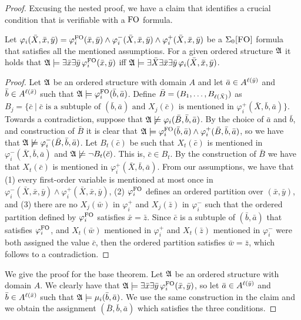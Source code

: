 \begin{proof}
	Excusing the nested proof, we have a claim that identifies a crucial condition that is verifiable with a ${\rm FO}$ formula. 
	\begin{claim}
		Let $\varphi_i(\bar{X},\bar{x},\bar{y}) = \varphi^{{\rm FO}}_i(\bar{x},\bar{y}) \wedge \varphi^{-}_i(\bar{X},\bar{x},\bar{y}) \wedge \varphi^{+}_i(\bar{X},\bar{x},\bar{y})$ be a $\Sigma_{0}\textsc{[FO]}$ formula that satisfies all the mentioned assumptions. For a given ordered structure $\mathfrak{A}$ it holds that $\mathfrak{A}\models\exists\bar{x}\exists\bar{y}\,\varphi^{{\rm FO}}_i(\bar{x},\bar{y})$ iff $\mathfrak{A}\models\exists\bar{X}\exists\bar{x}\exists\bar{y}\,\varphi_i(\bar{X},\bar{x},\bar{y})$.
	\end{claim}
	\begin{proof}
		Let $\mathfrak{A}$ be an ordered structure with domain $A$ and let $\bar{a}\in A^{\ell(\bar{y})}$ and $\bar{b}\in A^{\ell(\bar{x})}$ such that $\mathfrak{A}\models\varphi^{{\rm FO}}_i(\bar{b},\bar{a})$. Define $\bar{B} = (B_1,\ldots,B_{\ell(\bar{X})})$ as $B_j = \{\bar{c}\mid\bar{c}\text{ is a subtuple of $(\bar{b},\bar{a})$ and $X_j(\bar{c})$ is mentioned in $\varphi^{+}_i(\bar{X},\bar{b},\bar{a})$}\}$. Towards a contradiction, suppose that $\mathfrak{A}\not\models\varphi_i(\bar{B},\bar{b},\bar{a})$. By the choice of $\bar{a}$ and $\bar{b}$, and construction of $\bar{B}$ it is clear that $\mathfrak{A}\models\varphi^{{\rm FO}}_i(\bar{b},\bar{a})\wedge\varphi^{+}_i(\bar{B},\bar{b},\bar{a})$, so we have that $\mathfrak{A}\not\models\varphi^{-}_i(\bar{B},\bar{b},\bar{a})$. Let $B_t(\bar{c})$ be such that $X_t(\bar{c})$ is mentioned in $\varphi^{-}_i(\bar{X},\bar{b},\bar{a})$ and $\mathfrak{A}\not\models\neg B_t(\bar{c})$. This is, $\bar{c}\in B_t$. By the construction of $\bar{B}$ we have that $X_t(\bar{c})$ is mentioned in $\varphi^{+}_i(\bar{X},\bar{b},\bar{a})$. From our assumptions, we have that (1) every first-order variable is mentioned at most once in $\varphi^{-}_i(\bar{X},\bar{x},\bar{y}) \wedge \varphi^{+}_i(\bar{X},\bar{x},\bar{y})$, (2) $\varphi^{{\rm FO}}_i$ defines an ordered partition over $(\bar{x},\bar{y})$, and (3) there are no $X_j(\bar{w})$ in $\varphi^{+}_i$ and $X_j(\bar{z})$ in $\varphi^{-}_i$ such that the ordered partition defined by $\varphi^{{\rm FO}}_i$ satisfies $\bar{x} = \bar{z}$. Since $\bar{c}$ is a subtuple of $(\bar{b},\bar{a})$ that satisfies $\varphi^{{\rm FO}}_i$, and $X_t(\bar{w})$ mentioned in $\varphi^{+}_i$ and $X_t(\bar{z})$ mentioned in $\varphi^{-}_i$ were both assigned the value $\bar{c}$, then the ordered partition satisfies $\bar{w} = \bar{z}$, which follows to a contradiction.
	\end{proof}
	We give the proof for the base theorem. Let $\mathfrak{A}$ be an ordered structure with domain $A$. We clearly have that $\mathfrak{A}\models\exists\bar{x}\exists\bar{y}\,\varphi^{{\rm FO}}_i(\bar{x},\bar{y})$, so let $\bar{a}\in A^{\ell(\bar{y})}$ and $\bar{b}\in A^{\ell(\bar{x})}$ such that $\mathfrak{A}\models\mu_i(\bar{b},\bar{a})$. We use the same construction in the claim and we obtain the assignment $(\bar{B},\bar{b},\bar{a})$ which satisfies the three conditions.
\end{proof}

